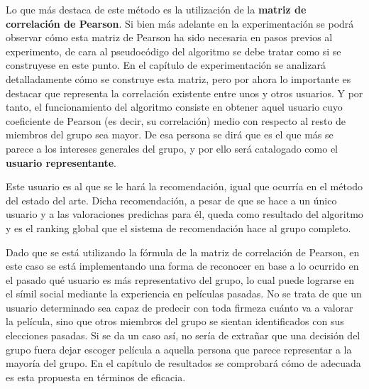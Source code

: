 Lo que más destaca de este método es la utilización de la \textbf{matriz de correlación de Pearson}. Si bien más adelante en la experimentación se podrá observar cómo esta matriz de Pearson ha sido necesaria en pasos previos al experimento, de cara al pseudocódigo del algoritmo se debe tratar como si se construyese en este punto. En el capítulo de experimentación se analizará detalladamente cómo se construye esta matriz, pero por ahora lo importante es destacar que representa la correlación existente entre unos y otros usuarios. Y por tanto, el funcionamiento del algoritmo consiste en obtener aquel usuario cuyo coeficiente de Pearson (es decir, su correlación) medio con respecto al resto de miembros del grupo sea mayor. De esa persona se dirá que es el que más se parece a los intereses generales del grupo, y por ello será catalogado como el \textbf{usuario representante}.

Este usuario es al que se le hará la recomendación, igual que ocurría en el método del estado del arte. Dicha recomendación, a pesar de que se hace a un único usuario y a las valoraciones predichas para él, queda como resultado del algoritmo y es el ranking global que el sistema de recomendación hace al grupo completo.

Dado que se está utilizando la fórmula de la matriz de correlación de Pearson, en este caso se está implementando una forma de reconocer en base a lo ocurrido en el pasado qué usuario es más representativo del grupo, lo cual puede lograrse en el símil social mediante la experiencia en películas pasadas. No se trata de que un usuario determinado sea capaz de predecir con toda firmeza cuánto va a valorar la película, sino que otros miembros del grupo se sientan identificados con sus elecciones pasadas. Si se da un caso así, no sería de extrañar que una decisión del grupo fuera dejar escoger película a aquella persona que parece representar a la mayoría del grupo. En el capítulo de resultados se comprobará cómo de adecuada es esta propuesta en términos de eficacia.